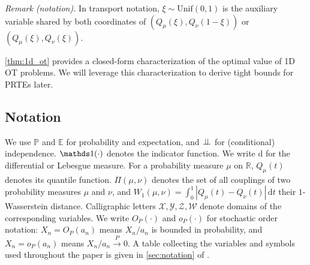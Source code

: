 \noindent\textit{Remark (notation).} In transport notation, $\xi\sim\mathrm{Unif}(0,1)$ is the auxiliary variable shared by both coordinates of $(Q_\mu(\xi),Q_\nu(1-\xi))$ or $(Q_\mu(\xi),Q_\nu(\xi))$.


\cref{thm:1d_ot} provides a closed-form characterization of the optimal value of 1D OT problems. We will leverage this characterization to derive tight bounds for PRTEs later.

\subsection{Notation}\label{subsec:notation}

We use $\mathbb{P}$ and $\mathbb{E}$ for probability and expectation, and $\perp\!\!\!\perp$ for (conditional) independence. $\indicator(\cdot)$ denotes the indicator function. We write $\mathrm{d}$ for the differential or Lebesgue measure. For a probability measure $\mu$ on $\mathbb{R}$, $Q_\mu(t)$ denotes its quantile function. $\Pi(\mu, \nu)$ denotes the set of all couplings of two probability measures $\mu$ and $\nu$, and $W_1(\mu,\nu)=\int_0^1 |Q_\mu(t)-Q_\nu(t)|\,\mathrm{d}t$ their $1$-Wasserstein distance. Calligraphic letters $\mathcal{X}, \mathcal{Y}, \mathcal{Z}, \mathcal{W}$ denote domains of the corresponding variables. We write $O_P(\cdot)$ and $o_P(\cdot)$ for stochastic order notation: $X_n = O_P(a_n)$ means $X_n/a_n$ is bounded in probability, and $X_n = o_P(a_n)$ means $X_n/a_n \xrightarrow{P} 0$. A table collecting the variables and symbols used throughout the paper is given in \cref{sec:notation} of \oalocation.
